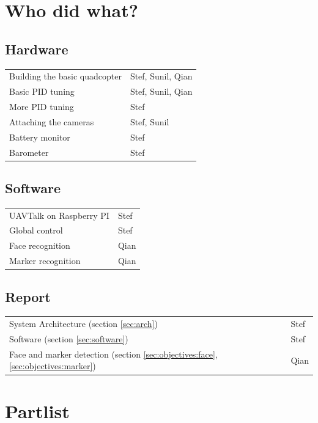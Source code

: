 \documentclass[11pt, a4paper, onecolumn, oneside, parskip=half]{scrartcl}
\begin{document}
\appendix
\newpage
\section{Who did what?}
\subsection{Hardware}
\begin{tabular}{ll}
Building the basic quadcopter & Stef, Sunil, Qian \\
Basic PID tuning & Stef, Sunil, Qian \\
More PID tuning & Stef \\
Attaching the cameras & Stef, Sunil \\
Battery monitor & Stef \\
Barometer & Stef \\
\end{tabular}

\subsection{Software}
\begin{tabular}{ll}
UAVTalk on Raspberry PI & Stef \\
Global control & Stef \\
Face recognition & Qian \\
Marker recognition & Qian \\
\end{tabular}

\subsection{Report}
\begin{tabular}{ll}
System Architecture (section \ref{sec:arch}) & Stef \\
Software (section \ref{sec:software}) & Stef \\
Face and marker detection (section \ref{sec:objectives:face}, \ref{sec:objectives:marker}) & Qian \\
\end{tabular}

\section{Partlist}
\end{document}
